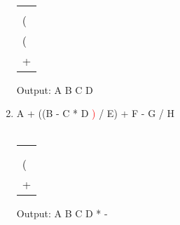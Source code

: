 \documentclass[a4paper]{article}
\begin{document}
\begin{large}
\begin{enumerate}
          \\
          \begin{tabular}[t]{ | p{1em} | }
            \makecell{*} \\ \hline
            \makecell{-} \\ \hline
            (            \\ \hline
            (            \\ \hline
            +            \\ \hline
          \end{tabular}
          \hspace{2em}
          Output: A B C D
    \item
          A + ((B - C * D \textcolor{red}{)} / E) + F - G / H\\
          \\
          \begin{tabular}[t]{ | p{1em} | }
            \makecell{} \\ \hline
            \makecell{} \\ \hline
            \\ \hline
            (           \\ \hline
            +           \\ \hline
          \end{tabular}
          \hspace{2em}
          Output: A B C D * -


\end{enumerate}
\end{large}
\end{document}
